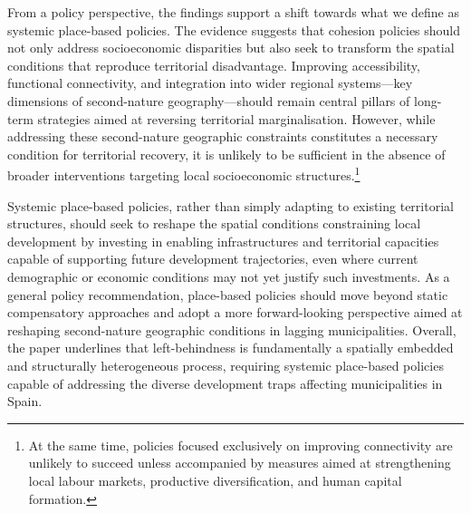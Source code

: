 \documentclass[a4paper,11pt,oneside]{article}
\begin{document}
From a policy perspective, the findings support a shift towards what we define as systemic place-based policies. The evidence suggests that cohesion policies should not only address socioeconomic disparities but also seek to transform the spatial conditions that reproduce territorial disadvantage.
Improving accessibility, functional connectivity, and integration into wider regional systems—key dimensions of second-nature geography—should remain central pillars of long-term strategies aimed at reversing territorial marginalisation. However, while addressing these second-nature geographic constraints constitutes a necessary condition for territorial recovery, it is unlikely to be sufficient in the absence of broader interventions targeting local socioeconomic structures.\footnote{At the same time, policies focused exclusively on improving connectivity are unlikely to succeed unless accompanied by measures aimed at strengthening local labour markets, productive diversification, and human capital formation.}

Systemic place-based policies, rather than simply adapting to existing territorial structures, should seek to reshape the spatial conditions constraining local development by investing in enabling infrastructures and territorial capacities capable of supporting future development trajectories, even where current demographic or economic conditions may not yet justify such investments. As a general policy recommendation, place-based policies should move beyond static compensatory approaches and adopt a more forward-looking perspective aimed at reshaping second-nature geographic conditions in lagging municipalities. Overall, the paper underlines that left-behindness is fundamentally a spatially embedded and structurally heterogeneous process, requiring systemic place-based policies capable of addressing the diverse development traps affecting municipalities in Spain.










\color{black}









\end{document}
